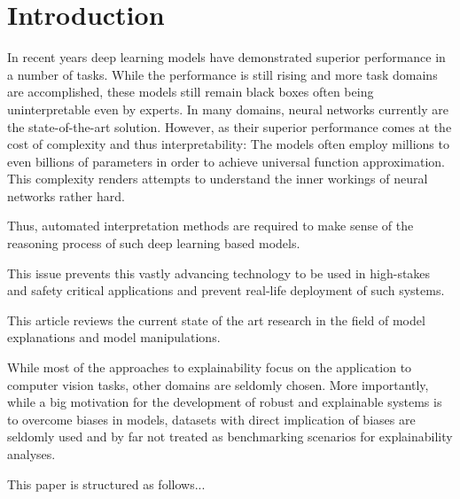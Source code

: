 \section{Introduction}
\label{sec:introduction}

In recent years deep learning models have demonstrated superior performance in a number of tasks. While the performance is still rising and more task domains  are accomplished, these models still remain black boxes often being uninterpretable even by experts. 
In many domains, neural networks currently are the state-of-the-art solution. However, as their superior performance comes at the cost of complexity and thus interpretability: The models often employ millions to even billions of parameters in order to achieve universal function approximation.
This complexity renders attempts to understand the inner workings of neural networks rather hard. 

Thus, automated interpretation methods are required to make sense of the reasoning process of such deep learning based models. 

This issue prevents this vastly advancing technology to be used in high-stakes and safety critical applications and prevent real-life deployment of such systems. 

This article reviews the current state of the art research in the field of model explanations and model manipulations. 



While most of the approaches to explainability focus on the application to computer vision tasks, other domains are seldomly chosen. 
More importantly, while a big motivation for the development of robust and explainable systems is to overcome biases in models, datasets with 
direct implication of biases are seldomly used and by far not treated as benchmarking scenarios for explainability analyses.  



This paper is structured as follows... 

